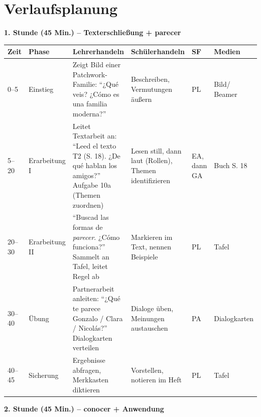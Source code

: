 \documentclass[11pt,a4paper]{article}
\begin{document}
\section{Verlaufsplanung}

\textbf{1. Stunde (45 Min.) -- Texterschließung + parecer}

\begin{longtable}{|p{0.8cm}|p{1.3cm}|p{4.5cm}|p{3.5cm}|p{1cm}|p{1.5cm}|}
\hline
\textbf{Zeit} & \textbf{Phase} & \textbf{Lehrerhandeln} & \textbf{Schülerhandeln} & \textbf{SF} & \textbf{Medien} \\
\hline
\endhead

0--5 & Einstieg & Zeigt Bild einer Patchwork-Familie: ``¿Qué veis? ¿Cómo es una familia moderna?'' & Beschreiben, Vermutungen äußern & PL & Bild/ Beamer \\
\hline

5--20 & Erar\-bei\-tung I & Leitet Textarbeit an: ``Leed el texto T2 (S. 18). ¿De qué hablan los amigos?'' Aufgabe 10a (Themen zuordnen) & Lesen still, dann laut (Rollen), Themen identifizieren & EA, dann GA & Buch S. 18 \\
\hline

20--30 & Erar\-bei\-tung II & ``Buscad las formas de \textit{parecer}. ¿Cómo funciona?'' Sammelt an Tafel, leitet Regel ab & Markieren im Text, nennen Beispiele & PL & Tafel \\
\hline

30--40 & Übung & Partnerarbeit anleiten: ``¿Qué te parece Gonzalo / Clara / Nicolás?'' Dialogkarten verteilen & Dialoge üben, Meinungen austauschen & PA & Dialog\-karten \\
\hline

40--45 & Siche\-rung & Ergebnisse abfragen, Merkkasten diktieren & Vorstellen, notieren im Heft & PL & Tafel \\
\hline
\end{longtable}

\vspace{0.5cm}

\textbf{2. Stunde (45 Min.) -- conocer + Anwendung}
\end{document}
